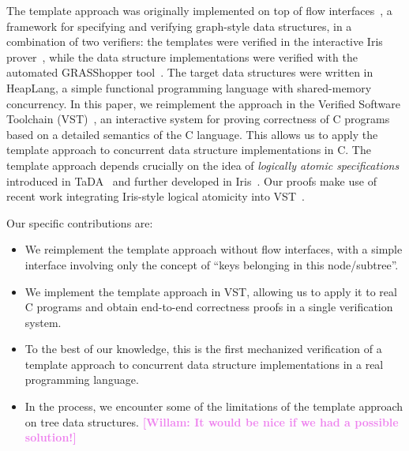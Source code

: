 \documentclass[a4paper,UKenglish,cleveref, autoref, thm-restate]{lipics-v2021}
\newcommand{\than}[1]{\textbf{\textcolor{blue}{[Than: #1]}}}
\newcommand{\wm}[1]{\textbf{\textcolor{violet}{[Willam: #1]}}}
\begin{document}

The template approach was originally implemented on top of flow interfaces~\cite{krishna2017flow}, a framework for specifying and verifying graph-style data structures, in a combination of two verifiers: the templates were verified in the interactive Iris prover~\cite{iris}, while the data structure implementations were verified with the automated GRASShopper tool~\cite{grasshopper}. The target data structures were written in HeapLang, a simple functional programming language with shared-memory concurrency. In this paper, we reimplement the approach in the Verified Software Toolchain (VST)~\cite{plcc}, an interactive system for proving correctness of C programs based on a detailed semantics of the C language. This allows us to apply the template approach to concurrent data structure implementations in C. The template approach depends crucially on the idea of \emph{logically atomic specifications} introduced in TaDA~\cite{tada} and further developed in Iris~\cite{iris}. Our proofs make use of recent work integrating Iris-style logical atomicity into VST~\cite{iris-vst-arxiv}. %

Our specific contributions are:
\begin{itemize}
\item We reimplement the template approach without flow interfaces, with a simple interface involving only the concept of ``keys belonging in this node/subtree''.
\item We implement the template approach in VST, allowing us to apply it to real C programs and obtain end-to-end correctness proofs in a single verification system.
\item To the best of our knowledge, this is the first mechanized verification of a template approach to concurrent data structure implementations in a real programming language.
\item In the process, we encounter some of the limitations of the template approach on tree data structures. \wm{It would be nice if we had a possible solution!}
\end{itemize}

\end{document}
